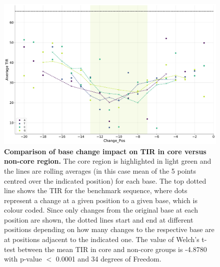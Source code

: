 \begin{figure}[!ht]
    \centering
    \includegraphics[scale=0.4]{plots/Supplementary/core_vs_noncore.pdf}
    \caption{\textbf{Comparison of base change impact on TIR in core versus non-core region.} 
    The core region is highlighted in light green and the lines are rolling averages (in this case mean of the 5 points centred over the indicated position) for each base.
    The top dotted line shows the TIR for the benchmark sequence, where dots represent a change at a given position to a given base, which is colour coded.
    Since only changes from the original base at each position are shown, the dotted lines start and end at different positions depending on how many changes to the respective base are at positions adjacent to the indicated one.
    The value of Welch's t-test between the mean TIR in core and non-core groups is -4.8780 with p-value $<$ 0.0001 and 34 degrees of Freedom.}
    \label{fig:core_vs_noncore}
\end{figure}

